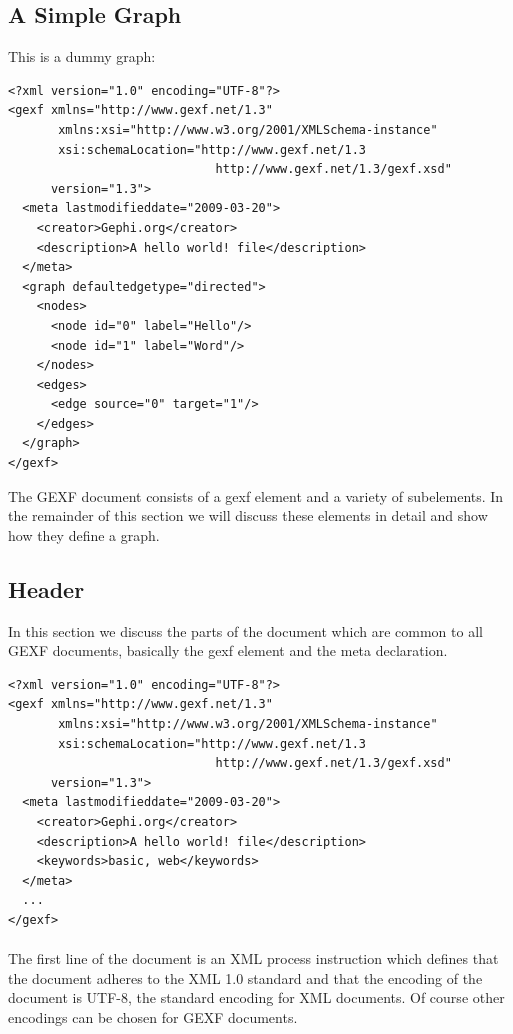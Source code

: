 \documentclass[a4paper,10pt]{article}
\begin{document}
\subsection{A Simple Graph}

This is a dummy graph:

\lstset{ style=gexf }
\begin{lstlisting}[caption={Hello world!},label=helloworld]
<?xml version="1.0" encoding="UTF-8"?>
<gexf xmlns="http://www.gexf.net/1.3"
       xmlns:xsi="http://www.w3.org/2001/XMLSchema-instance"
       xsi:schemaLocation="http://www.gexf.net/1.3
                             http://www.gexf.net/1.3/gexf.xsd"
      version="1.3">
  <meta lastmodifieddate="2009-03-20">
    <creator>Gephi.org</creator>
    <description>A hello world! file</description>
  </meta>
  <graph defaultedgetype="directed">
    <nodes>
      <node id="0" label="Hello"/>
      <node id="1" label="Word"/>
    </nodes>
    <edges>
      <edge source="0" target="1"/>
    </edges>
  </graph>
</gexf>
\end{lstlisting}

The GEXF document consists of a gexf element and a variety of subelements. In the remainder of this section we will discuss these elements in detail and show how they define a graph.

\subsection{Header}

In this section we discuss the parts of the document which are common to all GEXF documents, basically the gexf element and the meta declaration.

\lstset{ style=gexf }
\begin{lstlisting}[caption={Header},label=header]
<?xml version="1.0" encoding="UTF-8"?>
<gexf xmlns="http://www.gexf.net/1.3"
       xmlns:xsi="http://www.w3.org/2001/XMLSchema-instance"
       xsi:schemaLocation="http://www.gexf.net/1.3
                             http://www.gexf.net/1.3/gexf.xsd"
      version="1.3">
  <meta lastmodifieddate="2009-03-20">
    <creator>Gephi.org</creator>
    <description>A hello world! file</description>
    <keywords>basic, web</keywords>
  </meta>
  ...
</gexf>
\end{lstlisting}

\paragraph{}
The first line of the document is an XML process instruction which defines that the document adheres to the XML 1.0 standard and that the encoding of the document is UTF-8, the standard encoding for XML documents. Of course other encodings can be chosen for GEXF documents.
\end{document}
